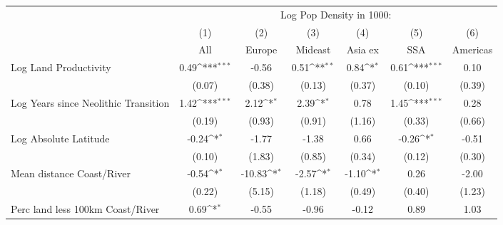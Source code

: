 {
\def\sym#1{\ifmmode^{#1}\else\(^{#1}\)\fi}
\begin{tabular}{l*{6}{c}}
\toprule
                    &\multicolumn{6}{c}{Log Pop Density in 1000:}                                                                                       \\
                    &\multicolumn{1}{c}{(1)}         &\multicolumn{1}{c}{(2)}         &\multicolumn{1}{c}{(3)}         &\multicolumn{1}{c}{(4)}         &\multicolumn{1}{c}{(5)}         &\multicolumn{1}{c}{(6)}         \\
                    &         All         &      Europe         &     Mideast         &     Asia ex         &         SSA         &    Americas         \\
\midrule
Log Land Productivity&        0.49\sym{***}&       -0.56         &        0.51\sym{**} &        0.84\sym{*}  &        0.61\sym{***}&        0.10         \\
                    &      (0.07)         &      (0.38)         &      (0.13)         &      (0.37)         &      (0.10)         &      (0.39)         \\
\addlinespace
Log Years since Neolithic Transition&        1.42\sym{***}&        2.12\sym{*}  &        2.39\sym{*}  &        0.78         &        1.45\sym{***}&        0.28         \\
                    &      (0.19)         &      (0.93)         &      (0.91)         &      (1.16)         &      (0.33)         &      (0.66)         \\
\addlinespace
Log Absolute Latitude&       -0.24\sym{*}  &       -1.77         &       -1.38         &        0.66         &       -0.26\sym{*}  &       -0.51         \\
                    &      (0.10)         &      (1.83)         &      (0.85)         &      (0.34)         &      (0.12)         &      (0.30)         \\
\addlinespace
Mean distance Coast/River&       -0.54\sym{*}  &      -10.83\sym{*}  &       -2.57\sym{*}  &       -1.10\sym{*}  &        0.26         &       -2.00         \\
                    &      (0.22)         &      (5.15)         &      (1.18)         &      (0.49)         &      (0.40)         &      (1.23)         \\
\addlinespace
Perc land less 100km Coast/River&        0.69\sym{*}  &       -0.55         &       -0.96         &       -0.12         &        0.89         &        1.03         \\

\end{tabular}}
